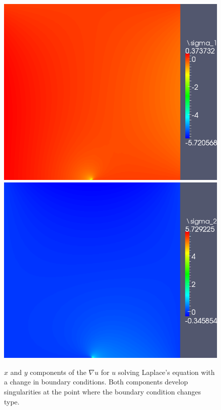 \documentclass[letterpaper]{article}
\newcommand{\Grad} {\ensuremath{\nabla}}
\begin{document}
\begin{figure}[!h]
\centering
\includegraphics[scale=.275]{figs/LaplaceFigs/LaplacePlateSigma1.png}
\includegraphics[scale=.275]{figs/LaplaceFigs/LaplacePlateSigma2.png}
\caption{$x$ and $y$ components of the $\Grad u$ for $u$ solving Laplace's
equation with a change in boundary conditions.  Both components develop
singularities at the point where the boundary condition changes type.}
\label{fig:laplaceStresses}
\end{figure}
\end{document}
